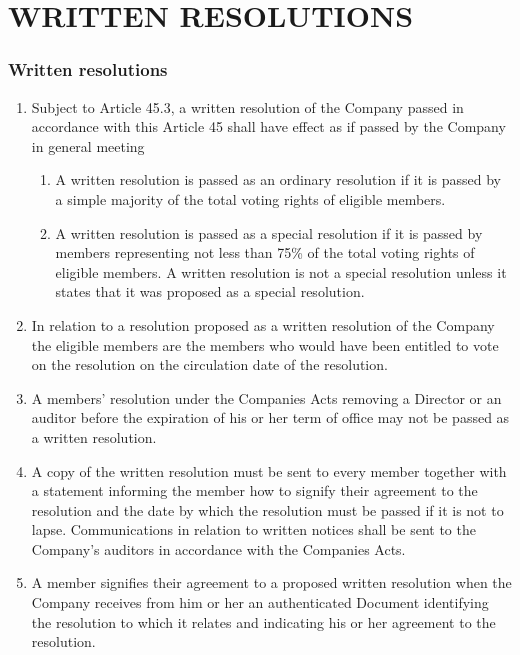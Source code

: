 \documentclass[a4paper,12pt]{article}
\begin{document}
\part*{WRITTEN RESOLUTIONS}

\section{Written resolutions}

\begin{enumerate}
  \item Subject to Article 45.3, a written resolution of the Company passed in accordance with this Article 45 shall have effect as if passed by the Company in general meeting
  \begin{enumerate}
    \item A written resolution is passed as an ordinary resolution if it is passed by a simple majority of the total voting rights of eligible members.
    \item A written resolution is passed as a special resolution if it is passed by members representing not less than 75\% of the total voting rights of eligible members. A written resolution is not a special resolution unless it states that it was proposed as a special resolution.
  \end{enumerate}
  \item In relation to a resolution proposed as a written resolution of the Company the eligible members are the members who would have been entitled to vote on the resolution on the circulation date of the resolution.
  \item A members' resolution under the Companies Acts removing a Director or an auditor before the expiration of his or her term of office may not be passed as a written resolution.
  \item A copy of the written resolution must be sent to every member together with a statement informing the member how to signify their agreement to the resolution and the date by which the resolution must be passed if it is not to lapse.  Communications in relation to written notices shall be sent to the Company's auditors in accordance with the Companies Acts.
  \item A member signifies their agreement to a proposed written resolution when the Company receives from him or her an authenticated Document identifying the resolution to which it relates and indicating his or her agreement to the resolution.
  \begin{enumerate}

\end{enumerate}
\end{enumerate}
\end{document}
